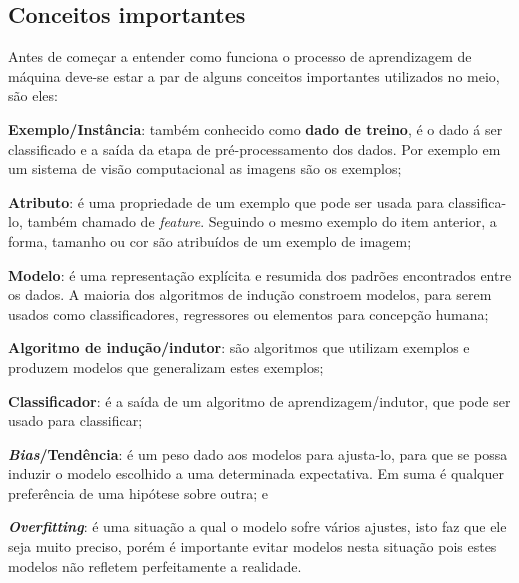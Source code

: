  \subsection{Conceitos importantes}
 \label{subsec:conceitos}
 Antes de começar a entender como funciona o processo de aprendizagem de máquina deve-se estar a par de alguns conceitos importantes 
 utilizados no meio, são eles:
  \begin{alineas}
  	\item \textbf{Exemplo/Instância}: também conhecido como \textbf{dado de treino}, é o dado á ser classificado e a saída da etapa de pré-processamento dos dados.
	Por exemplo em um sistema de visão computacional as imagens são os exemplos;
	\item \textbf{Atributo}: é uma propriedade de um exemplo que pode ser usada para classifica-lo, também chamado de \textit{feature}. Seguindo o mesmo exemplo do item anterior,
	a forma, tamanho ou cor são atribuídos de um exemplo de imagem;
	\item \textbf{Modelo}: é uma representação explícita e resumida dos padrões encontrados entre os dados. A maioria dos algoritmos de indução constroem modelos,
	para serem usados como classificadores, regressores ou elementos para concepção humana;
	\item \textbf{Algoritmo de indução/indutor}: são algoritmos que utilizam exemplos e produzem modelos que generalizam estes exemplos;
	\item \textbf{Classificador}: é a saída de um algoritmo de aprendizagem/indutor, que pode ser usado para classificar;	
	\item \textbf{\textit{Bias}/Tendência}: é um peso dado aos modelos para ajusta-lo, para que se possa induzir o modelo escolhido
	 a uma determinada expectativa. Em suma é qualquer preferência de uma hipótese sobre outra; e
	 \item \textbf{\textit{Overfitting}}: é uma situação a qual o modelo sofre vários ajustes, isto faz que ele seja muito preciso, 
	 porém é importante evitar modelos nesta situação pois estes modelos não refletem perfeitamente a realidade.
  \end{alineas}  
